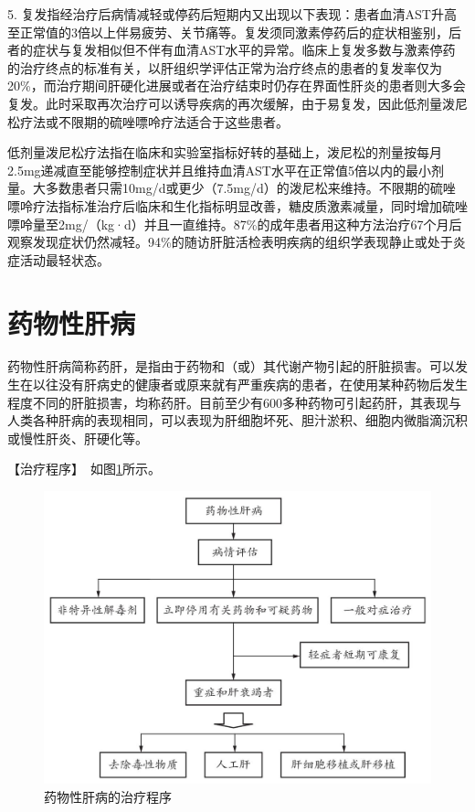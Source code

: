 5.
复发指经治疗后病情减轻或停药后短期内又出现以下表现：患者血清AST升高至正常值的3倍以上伴易疲劳、关节痛等。复发须同激素停药后的症状相鉴别，后者的症状与复发相似但不伴有血清AST水平的异常。临床上复发多数与激素停药的治疗终点的标准有关，以肝组织学评估正常为治疗终点的患者的复发率仅为20\%，而治疗期间肝硬化进展或者在治疗结束时仍存在界面性肝炎的患者则大多会复发。此时采取再次治疗可以诱导疾病的再次缓解，由于易复发，因此低剂量泼尼松疗法或不限期的硫唑嘌呤疗法适合于这些患者。

低剂量泼尼松疗法指在临床和实验室指标好转的基础上，泼尼松的剂量按每月2.5mg递减直至能够控制症状并且维持血清AST水平在正常值5倍以内的最小剂量。大多数患者只需10mg/d或更少（7.5mg/d）的泼尼松来维持。不限期的硫唑嘌呤疗法指标准治疗后临床和生化指标明显改善，糖皮质激素减量，同时增加硫唑嘌呤量至2mg/（kg·d）并且一直维持。87\%的成年患者用这种方法治疗67个月后观察发现症状仍然减轻。94\%的随访肝脏活检表明疾病的组织学表现静止或处于炎症活动最轻状态。

\section{药物性肝病}

药物性肝病简称药肝，是指由于药物和（或）其代谢产物引起的肝脏损害。可以发生在以往没有肝病史的健康者或原来就有严重疾病的患者，在使用某种药物后发生程度不同的肝脏损害，均称药肝。目前至少有600多种药物可引起药肝，其表现与人类各种肝病的表现相同，可以表现为肝细胞坏死、胆汁淤积、细胞内微脂滴沉积或慢性肝炎、肝硬化等。

【治疗程序】　如图\ref{fig3-12-1}所示。

\begin{figure}[!htbp]
 \centering
 \includegraphics{./images/Image00102.jpg}
 \captionsetup{justification=centering}
 \caption{药物性肝病的治疗程序}
 \label{fig3-12-1}
  \end{figure} 

